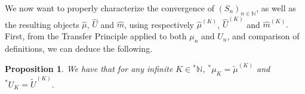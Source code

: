 \documentclass{amsart}
\newtheorem{thm}{Theorem}[section]
\newtheorem{prop}[thm]{Proposition}
\theoremstyle{definition}
\theoremstyle{remark}
\def \Dom{\operatorname{dom}}
\def \St{\operatorname{st}}
\def \Borel{\operatorname{Borel}}
\def \HOM{\hat{\Omega}}
\def \HMU{\hat{\mu}}
\def \HNU{\hat{\nu}}
\def \HU{\hat{U}}
\def \Hm{\hat{m}}
\begin{document}
%	
%	
%	


We now want to properly characterize the convergence of $(S_n)_{n\in\mathbb{N}}$, as well as the resulting objects $\HMU$, $\HU$ and $\Hm$, using respectively $\HMU^{(K)}$, $\HU^{(K)}$ and $\Hm^{(K)}.$ First, from the Transfer Principle applied to both $\mu_n$ and $U_n$, and comparison of definitions, we can deduce the following.

\begin{prop}
	We have that for any infinite $K\in{}^*\mathbb{N}$, ${}^*\mu_K=\tilde{\mu}^{(K)}$ and ${}^*U_K=\tilde{U}^{(K)}.$
\end{prop}
\end{document}
